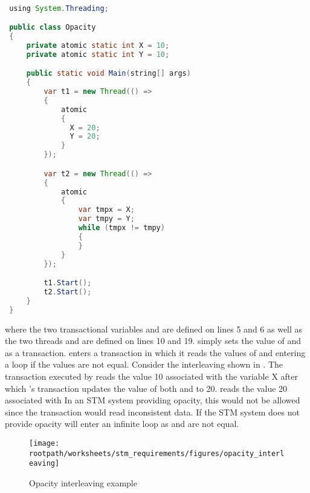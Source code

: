 \begin{lstlisting}[label=lst:stm_opacity,
 caption={Opacity example},
 language=Java, 
 showspaces=false,
 showtabs=false,
 breaklines=true,
 showstringspaces=false,
 breakatwhitespace=true,
 commentstyle=\color{greencomments},
 keywordstyle=\color{bluekeywords},
 stringstyle=\color{redstrings},
 morekeywords={atomic, retry, orelse, var, get, set, using}]  % Start your code-block

 using System.Threading;

 public class Opacity
 {
     private atomic static int X = 10;
     private atomic static int Y = 10;

     public static void Main(string[] args)
     {
         var t1 = new Thread(() =>
         {
             atomic
             {
               X = 20;
               Y = 20;
             }
         });

         var t2 = new Thread(() =>
         {
             atomic
             {
                 var tmpx = X;
                 var tmpy = Y;
                 while (tmpx != tmpy)
                 {
                 }
             }
         });

         t1.Start();
         t2.Start();
     }
 }
\end{lstlisting}
where the two transactional variables  and  are defined on lines 5 and 6 as well as the two threads  and  are defined on lines 10 and 19.  simply sets the value of  and  as a transaction.  enters a transaction in which it reads the values of  and  entering a loop if the values are not equal. Consider the interleaving shown in . The transaction executed by  reads the value 10 associated with the variable X after which 's transaction updates the value of both   and  to 20.  reads the value 20 associated with  In an \ac{STM} system providing opacity, this would not be allowed since the transaction would read inconsistent data. If the \ac{STM} system does not provide opacity  will enter an infinite loop as  and  are not equal.

\begin{figure}[htbp]
\centering
\texttt{[image: \\rootpath/worksheets/stm\_requirements/figures/opacity\_interleaving]}
\caption{Opacity interleaving example}
\label{fig:opacity_interleaving}
\end{figure}

